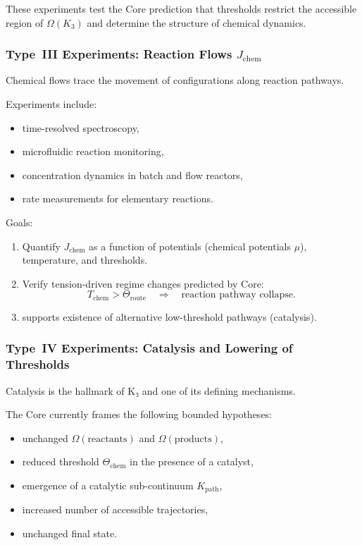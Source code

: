 These experiments test the Core prediction that thresholds restrict the
accessible region of $\Omega(K_3)$ and determine the structure of
chemical dynamics.



\subsubsection{Type~III Experiments: Reaction Flows $J_{\mathrm{chem}}$}

Chemical flows trace the movement of configurations along reaction pathways.

Experiments include:

\begin{itemize}
    \item time-resolved spectroscopy,
    \item microfluidic reaction monitoring,
    \item concentration dynamics in batch and flow reactors,
    \item rate measurements for elementary reactions.
\end{itemize}

Goals:

\begin{enumerate}
    \item Quantify $J_{\mathrm{chem}}$ as a function of potentials
          (chemical potentials $\mu$), temperature, and thresholds.
    \item Verify tension-driven regime changes predicted by Core:
          \[
             T_{\mathrm{chem}} > \Theta_{\mathrm{route}}
             \quad \Rightarrow \quad
             \text{reaction pathway collapse}.
          \]
    \item supports existence of alternative low-threshold pathways
          (catalysis).
\end{enumerate}



\subsubsection{Type~IV Experiments: Catalysis and Lowering of Thresholds}

Catalysis is the hallmark of K₃ and one of its defining mechanisms.

The Core currently frames the following bounded hypotheses: \begin{itemize}
    \item unchanged $\Omega(\text{reactants})$ and $\Omega(\text{products})$,
    \item reduced threshold $\Theta_{\mathrm{chem}}$ in the presence of a
          catalyst,
    \item emergence of a catalytic sub-continuum $K_{\mathrm{path}}$,
    \item increased number of accessible trajectories,
    \item unchanged final state.
\end{itemize}

